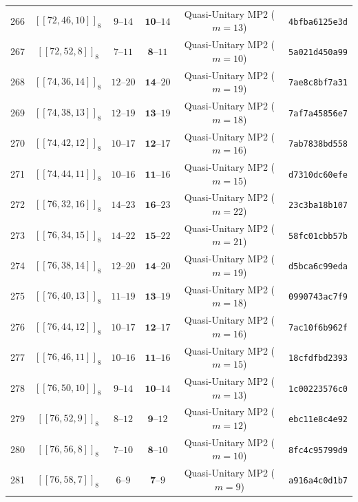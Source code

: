\documentclass[11pt,a4paper]{article}
\theoremstyle{remark}
\begin{document}
{\begin{longtable}{@{}rccccl@{}}
266 & $[[72,46,10]]_{8}$ & $9\text{--}14$ & $\mathbf{10}\text{--}14$ & Quasi-Unitary MP2 ($m=13$) & \texttt{4bfba6125e3d} \\
267 & $[[72,52,8]]_{8}$ & $7\text{--}11$ & $\mathbf{8}\text{--}11$ & Quasi-Unitary MP2 ($m=10$) & \texttt{5a021d450a99} \\
268 & $[[74,36,14]]_{8}$ & $12\text{--}20$ & $\mathbf{14}\text{--}20$ & Quasi-Unitary MP2 ($m=19$) & \texttt{7ae8c8bf7a31} \\
269 & $[[74,38,13]]_{8}$ & $12\text{--}19$ & $\mathbf{13}\text{--}19$ & Quasi-Unitary MP2 ($m=18$) & \texttt{7af7a45856e7} \\
270 & $[[74,42,12]]_{8}$ & $10\text{--}17$ & $\mathbf{12}\text{--}17$ & Quasi-Unitary MP2 ($m=16$) & \texttt{7ab7838bd558} \\
271 & $[[74,44,11]]_{8}$ & $10\text{--}16$ & $\mathbf{11}\text{--}16$ & Quasi-Unitary MP2 ($m=15$) & \texttt{d7310dc60efe} \\
272 & $[[76,32,16]]_{8}$ & $14\text{--}23$ & $\mathbf{16}\text{--}23$ & Quasi-Unitary MP2 ($m=22$) & \texttt{23c3ba18b107} \\
273 & $[[76,34,15]]_{8}$ & $14\text{--}22$ & $\mathbf{15}\text{--}22$ & Quasi-Unitary MP2 ($m=21$) & \texttt{58fc01cbb57b} \\
274 & $[[76,38,14]]_{8}$ & $12\text{--}20$ & $\mathbf{14}\text{--}20$ & Quasi-Unitary MP2 ($m=19$) & \texttt{d5bca6c99eda} \\
275 & $[[76,40,13]]_{8}$ & $11\text{--}19$ & $\mathbf{13}\text{--}19$ & Quasi-Unitary MP2 ($m=18$) & \texttt{0990743ac7f9} \\
276 & $[[76,44,12]]_{8}$ & $10\text{--}17$ & $\mathbf{12}\text{--}17$ & Quasi-Unitary MP2 ($m=16$) & \texttt{7ac10f6b962f} \\
277 & $[[76,46,11]]_{8}$ & $10\text{--}16$ & $\mathbf{11}\text{--}16$ & Quasi-Unitary MP2 ($m=15$) & \texttt{18cfdfbd2393} \\
278 & $[[76,50,10]]_{8}$ & $9\text{--}14$ & $\mathbf{10}\text{--}14$ & Quasi-Unitary MP2 ($m=13$) & \texttt{1c00223576c0} \\
279 & $[[76,52,9]]_{8}$ & $8\text{--}12$ & $\mathbf{9}\text{--}12$ & Quasi-Unitary MP2 ($m=12$) & \texttt{ebc11e8c4e92} \\
280 & $[[76,56,8]]_{8}$ & $7\text{--}10$ & $\mathbf{8}\text{--}10$ & Quasi-Unitary MP2 ($m=10$) & \texttt{8fc4c95799d9} \\
281 & $[[76,58,7]]_{8}$ & $6\text{--}9$ & $\mathbf{7}\text{--}9$ & Quasi-Unitary MP2 ($m=9$) & \texttt{a916a4c0d1b7} \\

\end{longtable}}
\end{document}
